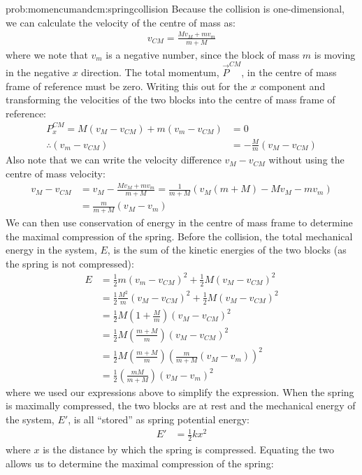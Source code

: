 \begin{solution}{prob:momencumandcm:springcollision}
Because the collision is one-dimensional, we can calculate the velocity of the centre of mass as:
\begin{align*}
v_{CM} = \frac{Mv_M+mv_m}{m+M}
\end{align*}
where we note that $v_m$ is a negative number, since the block of mass $m$ is moving in the negative $x$ direction. The total momentum, $\vec P^{CM}$, in the centre of mass frame of reference must be zero. Writing this out for the $x$ component and transforming the velocities of the two blocks into the centre of mass frame of reference:
\begin{align*}
P^{CM}_x = M(v_M-v_{CM})+m(v_m-v_{CM})&=0\\
\therefore (v_m-v_{CM}) &= -\frac{M}{m}(v_M-v_{CM})
\end{align*}
Also note that we can write the velocity difference $v_M-v_{CM}$ without using the centre of mass velocity:
\begin{align*}
v_M-v_{CM} &= v_M-\frac{Mv_M+mv_m}{m+M}=\frac{1}{m+M}(v_M(m+M)-Mv_M-mv_m)\\
&=\frac{m}{m+M}(v_M-v_m)
\end{align*}
We can then use conservation of energy in the centre of mass frame to determine the maximal compression of the spring. Before the collision, the total mechanical energy in the system, $E$, is the sum of the kinetic energies of the two blocks (as the spring is not compressed):
\begin{align*}
E&=\frac{1}{2}m(v_m-v_{CM})^2+\frac{1}{2}M(v_M-v_{CM})^2\\
&=\frac{1}{2}\frac{M^2}{m}(v_M-v_{CM})^2+\frac{1}{2}M(v_M-v_{CM})^2\\
&=\frac{1}{2}M \left( 1 + \frac{M}{m}\right) (v_M-v_{CM})^2\\
&=\frac{1}{2}M \left(\frac{m+M}{m} \right)(v_M-v_{CM})^2\\
&=\frac{1}{2}M \left(\frac{m+M}{m} \right)\left(\frac{m}{m+M}(v_M-v_m)\right)^2\\
&=\frac{1}{2} \left(\frac{mM}{m+M}\right)(v_M-v_m)^2
\end{align*}
where we used our expressions above to simplify the expression. When the spring is maximally compressed, the two blocks are at rest and the mechanical energy of the system, $E'$, is all ``stored'' as spring potential energy:
\begin{align*}
E'&=\frac{1}{2}kx^2
\end{align*}
where $x$ is the distance by which the spring is compressed. Equating the two allows us to determine the maximal compression of the spring:

\end{solution}
